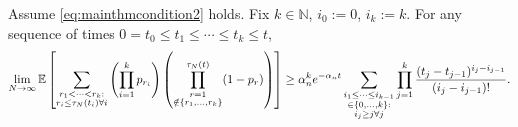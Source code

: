 \begin{lemma}\label{thm:inductionLB}
Assume \eqref{eq:mainthmcondition2} holds.
Fix $k \in \mathbb{N}$, $i_0:=0$, $i_k:=k$. For any sequence of times
$0 = t_0 \leq t_1 \leq \cdots \leq t_k \leq t$,
\begin{equation*}
\lim_{N\to\infty} \mathbb{E} \left[ 
        \sum_{\substack{r_1 <\dots< r_k :\\ r_i \leq \tau_N(t_i) \forall i}}
        \left( \prod_{i=1}^k p_{r_i} \right)
        \left( \prod_{\substack{r=1 \\ \notin \{r_1,\dots,r_k\} }}^{\tau_N(t)} 
        (1-p_r) \right) \right]
\geq \alpha_n^k e^{-\alpha_n t}
        \sum_{\substack{i_1\leq \dots\leq i_{k-1}\\ \in \{0,\dots,k\} :
        \\ i_j \geq j \forall j}} 
        \prod_{j=1}^k \frac{(t_j - t_{j-1})^{i_j - i_{j-1}}}{(i_j - i_{j-1})! } .
\end{equation*}
\end{lemma}

